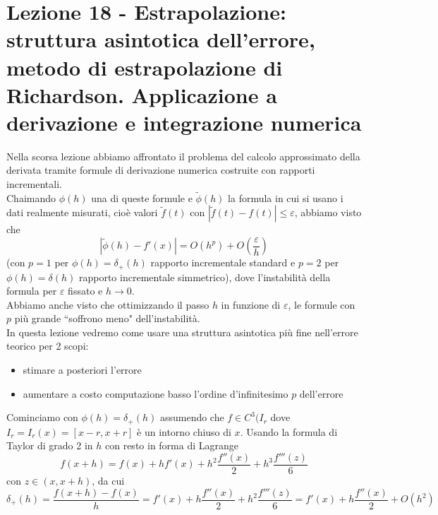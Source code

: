 \section[Lezione 18 - Estrapolazione]{Lezione 18 - Estrapolazione: struttura asintotica dell'errore, metodo di estrapolazione di Richardson. Applicazione a derivazione e integrazione numerica}
Nella scorsa lezione abbiamo affrontato il problema del calcolo approssimato della derivata tramite formule di derivazione numerica costruite con rapporti incrementali.\\Chaimando $\phi(h)$ una di queste
formule e $\tilde{\phi}(h)$ la formula in cui si usano i dati realmente misurati, cioè valori $\tilde{f}(t)$ con $|\tilde{f}(t)-f(t)|\leq\varepsilon$, abbiamo visto che
\begin{equation*}
    |\tilde{\phi}(h)-f'(x)|=O(h^p)+O(\frac{\varepsilon}{h})
\end{equation*}
(con $p=1$ per $\phi(h)=\delta_+(h)$ rapporto incrementale standard e $p=2$ per $\phi(h)=\delta(h)$ rapporto incrementale simmetrico), dove l'instabilità della formula per $\varepsilon$ fissato e $h\rightarrow0$.\\
Abbiamo anche visto che ottimizzando il passo $h$ in funzione di $\varepsilon$, le formule con $p$ più grande ``soffrono meno" dell'instabilità. \\In questa lezione vedremo come usare una struttura asintotica più fine nell'errore teorico per 2 scopi:
\begin{itemize}
    \item stimare a posteriori l'errore
    \item aumentare a costo computazione basso l'ordine d'infinitesimo $p$ dell'errore
\end{itemize}
Cominciamo con $\phi(h)=\delta_+(h)$ assumendo che $f\in C^3(I_r$ dove $I_r=I_r(x)=[x-r,x+r]$ è un intorno chiuso di $x$. Usando la formula di Taylor di grado 2 in $h$ con resto in forma di Lagrange
\begin{equation*}
    f(x+h)=f(x)+hf'(x)+h^2\frac{f''(x)}{2}+h^3\frac{f'''(z)}{6}
\end{equation*}
con $z\in (x,x+h)$, da cui 
\begin{equation*}
    \delta_+(h)=\frac{f(x+h)-f(x)}{h}=f'(x)+h\frac{f''(x)}{2}+h^2\frac{f'''(z)}{6}=f'(x)+h\frac{f''(x)}{2}+O(h^2)
\end{equation*}
